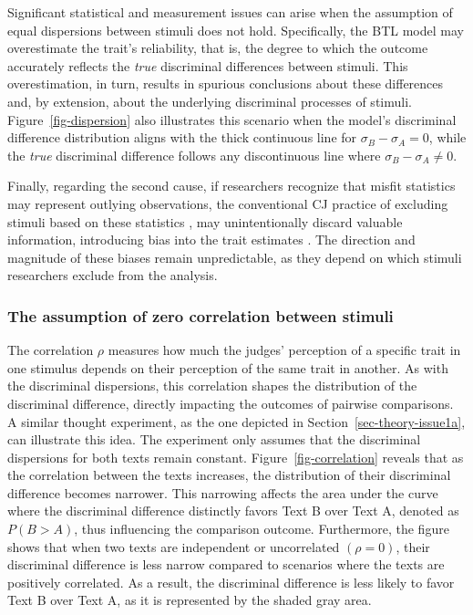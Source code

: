 \documentclass[
  authoryear,
  review,
  1p]{elsarticle}
\begin{document}
Significant statistical and measurement issues can arise when the
assumption of equal dispersions between stimuli does not hold.
Specifically, the BTL model may overestimate the trait's reliability,
that is, the degree to which the outcome accurately reflects the
\emph{true} discriminal differences between stimuli. This
overestimation, in turn, results in spurious conclusions about these
differences \citep[pp.~370]{McElreath_2020} and, by extension, about the
underlying discriminal processes of stimuli. Figure~\ref{fig-dispersion}
also illustrates this scenario when the model's discriminal difference
distribution aligns with the thick continuous line for
\(\sigma_{B}-\sigma_{A}=0\), while the \emph{true} discriminal
difference follows any discontinuous line where
\(\sigma_{B}-\sigma_{A} \neq 0\).

Finally, regarding the second cause, if researchers recognize that
misfit statistics may represent outlying observations, the conventional
CJ practice of excluding stimuli based on these statistics
\citep{Pollitt_2012a, Pollitt_2012b, vanDaal_et_al_2016, Goossens_et_al_2018},
may unintentionally discard valuable information, introducing bias into
the trait estimates \citep[chap.~12]{Zimmerman_1994, McElreath_2020}.
The direction and magnitude of these biases remain unpredictable, as
they depend on which stimuli researchers exclude from the analysis.

\subsubsection{The assumption of zero correlation between
stimuli}\label{sec-theory-issue1b}

The correlation \(\rho\) measures how much the judges' perception of a
specific trait in one stimulus depends on their perception of the same
trait in another. As with the discriminal dispersions, this correlation
shapes the distribution of the discriminal difference, directly
impacting the outcomes of pairwise comparisons. A similar thought
experiment, as the one depicted in Section~\ref{sec-theory-issue1a}, can
illustrate this idea. The experiment only assumes that the discriminal
dispersions for both texts remain constant. Figure~\ref{fig-correlation}
reveals that as the correlation between the texts increases, the
distribution of their discriminal difference becomes narrower. This
narrowing affects the area under the curve where the discriminal
difference distinctly favors Text B over Text A, denoted as
\(P(B > A)\), thus influencing the comparison outcome. Furthermore, the
figure shows that when two texts are independent or uncorrelated
\((\rho=0)\), their discriminal difference is less narrow compared to
scenarios where the texts are positively correlated. As a result, the
discriminal difference is less likely to favor Text B over Text A, as it
is represented by the shaded gray area.
\end{document}
